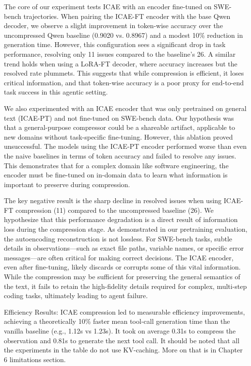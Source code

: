 The core of our experiment tests ICAE with an encoder fine-tuned on SWE-bench trajectories.
When pairing the ICAE-FT encoder with the base Qwen decoder, we observe a slight improvement in token-wise accuracy over the uncompressed Qwen baseline (0.9020 vs. 0.8967) and a modest 10\% reduction in generation time.
However, this configuration sees a significant drop in task performance, resolving only 11 issues compared to the baseline's 26.
A similar trend holds when using a LoRA-FT decoder, where accuracy increases but the resolved rate plummets.
This suggests that while compression is efficient, it loses critical information, and that token-wise accuracy is a poor proxy for end-to-end task success in this agentic setting.

We also experimented with an ICAE encoder that was only pretrained on general text (ICAE-PT) and not fine-tuned on SWE-bench data.
Our hypothesis was that a general-purpose compressor could be a shareable artifact, applicable to new domains without task-specific fine-tuning.
However, this ablation proved unsuccessful.
The models using the ICAE-PT encoder performed worse than even the naive baselines in terms of token accuracy and failed to resolve any issues.
This demonstrates that for a complex domain like software engineering, the encoder must be fine-tuned on in-domain data to learn what information is important to preserve during compression.

The key negative result is the sharp decline in resolved issues when using ICAE-FT compression (11) compared to the uncompressed baseline (26).
We hypothesize that this performance degradation is a direct result of information loss during the compression stage.
As demonstrated in our pretraining evaluation, the autoencoding reconstruction is not lossless.
For SWE-bench tasks, subtle details in observations—such as exact file paths, variable names, or specific error messages—are often critical for making correct decisions.
The ICAE encoder, even after fine-tuning, likely discards or corrupts some of this vital information.
While the compression may be sufficient for preserving the general semantics of the text, it fails to retain the high-fidelity details required for complex, multi-step coding tasks, ultimately leading to agent failure.


Efficiency Results: ICAE \cite{ge_-context_2024} compression led to measurable efficiency improvements, achieving a theoretically 10\% faster mean tool-call generation time than the vanilla baseline (e.g., 1.12s vs 1.23s).
It took on average 0.31s to compress the observation and 0.81s to generate the next tool call.
It should be noted that all the experiments in the table do not use KV-caching.
More on that is in Chapter 6 limitations section.


